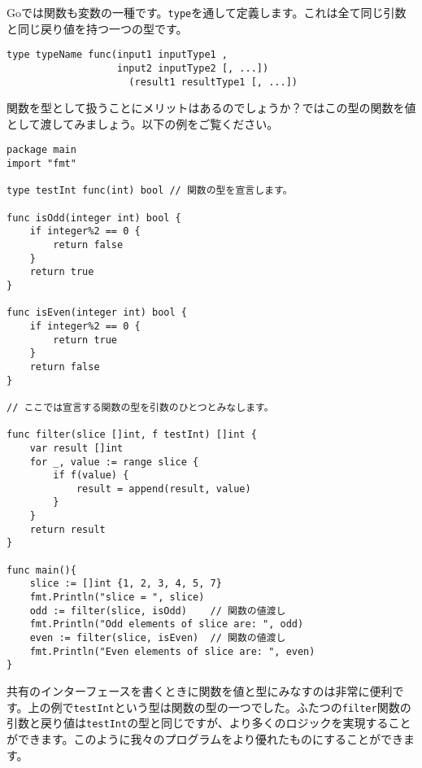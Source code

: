 Goでは関数も変数の一種です。\texttt{type}を通して定義します。これは全て同じ引数と同じ戻り値を持つ一つの型です。


\begin{lstlisting}[numbers=none]
type typeName func(input1 inputType1 ,
                   input2 inputType2 [, ...])
                     (result1 resultType1 [, ...])
\end{lstlisting}

関数を型として扱うことにメリットはあるのでしょうか？ではこの型の関数を値として渡してみましょう。以下の例をご覧ください。

\begin{lstlisting}[numbers=none]
package main
import "fmt"

type testInt func(int) bool // 関数の型を宣言します。

func isOdd(integer int) bool {
    if integer%2 == 0 {
        return false
    }
    return true
}

func isEven(integer int) bool {
    if integer%2 == 0 {
        return true
    }
    return false
}

// ここでは宣言する関数の型を引数のひとつとみなします。

func filter(slice []int, f testInt) []int {
    var result []int
    for _, value := range slice {
        if f(value) {
            result = append(result, value)
        }
    }
    return result
}

func main(){
    slice := []int {1, 2, 3, 4, 5, 7}
    fmt.Println("slice = ", slice)
    odd := filter(slice, isOdd)    // 関数の値渡し
    fmt.Println("Odd elements of slice are: ", odd)
    even := filter(slice, isEven)  // 関数の値渡し
    fmt.Println("Even elements of slice are: ", even)
}
\end{lstlisting}

共有のインターフェースを書くときに関数を値と型にみなすのは非常に便利です。上の例で\texttt{testInt}という型は関数の型の一つでした。ふたつの\texttt{filter}関数の引数と戻り値は\texttt{testInt}の型と同じですが、より多くのロジックを実現することができます。このように我々のプログラムをより優れたものにすることができます。

